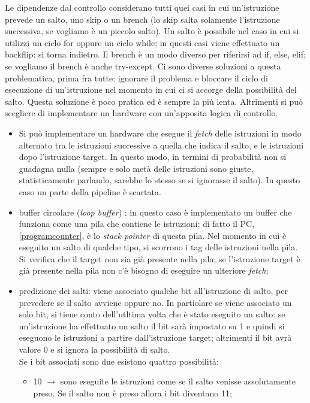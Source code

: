 \documentclass{article}
\begin{document}
Le dipendenze dal controllo considerano tutti quei casi in cui un'istruzione prevede un salto, uno skip o un brench (lo skip salta solamente l'istruzione successiva, se vogliamo è un piccolo salto). Un salto è possibile nel caso in cui si utilizzi un ciclo for oppure un ciclo while; in questi casi viene effettuato un backflip: si torna indietro. Il brench è un modo diverso per riferirsi ad if, else, elif; se vogliamo il brench è anche try-except. Ci sono diverse soluzioni a questa problematica, prima fra tutte: ignorare il problema e bloccare il ciclo di esecuzione di un'istruzione nel momento in cui ci si accorge della possibilità del salto. Questa soluzione è poco pratica ed è sempre la più lenta.
Altrimenti si può scegliere di implementare un hardware con un'apposita logica di controllo.

\begin{itemize}
	\item Si può implementare un hardware che esegue il \textit{fetch} delle istruzioni in modo alternato tra le istruzioni successive a quella che indica il salto, e le istruzioni dopo l'istruzione target. In questo modo, in termini di probabilità non si guadagna nulla (sempre e solo metà delle istruzioni sono giuste, statisticamente parlando, sarebbe lo stesso se si ignorasse il salto). In questo caso un parte della pipeline è scartata.

	\item buffer circolare (\textit{loop buffer}) \label{loopbuffer}: in questo caso è implementato un buffer che funziona come una pila che contiene le istruzioni; di fatto il PC, \autoref{programcounter}, è lo \textit{stack pointer} di questa pila. Nel momento in cui è eseguito un salto di qualche tipo, si scorrono i tag delle istruzioni nella pila. Si verifica che il target non sia già presente nella pila; se l'istruzione target è già presente nella pila non c'è bisogno di eseguire un ulteriore \textit{fetch};

	\item predizione dei salti: viene associato qualche bit all'istruzione di salto, per prevedere se il salto avviene oppure no. In partiolare se viene associato un solo bit, si tiene conto dell'utltima volta che è stato eseguito un salto: se un'istruzione ha effettuato un salto il bit sarà impostato su 1 e quindi si eseguono le istruzioni a partire dall'istruzione target; altrimenti il bit avrà valore 0 e si ignora la possibilità di salto. \\
	Se i bit associati sono due esistono quattro possibilità:
	\begin{itemize}
		\item 10 $\rightarrow$ sono eseguite le istruzioni come se il salto venisse assolutamente preso. Se il salto non è preso allora i bit diventano 11;


\end{itemize}
\end{itemize}
\end{document}
